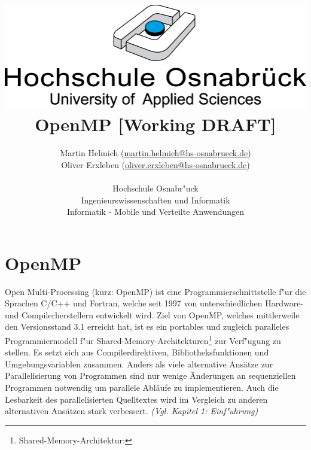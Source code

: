 \documentclass[11pt]{scrartcl}
\begin{document}
\author{%
	Martin Helmich \small(\href{mailto:martin.helmich@hs-osnabrueck.de}{martin.helmich@hs-osnabrueck.de})\\%
	Oliver Erxleben \small(\href{mailto:oliver.erxleben@hs-osnabrueck.de}{oliver.erxleben@hs-osnabrueck.de})\\ \\%
	Hochschule Osnabr"uck \\%
	Ingenieurswissenschaften und Informatik \\%
	Informatik - Mobile und Verteilte Anwendungen }

\title{\includegraphics[scale=0.75,keepaspectratio]{img/hs_os.png}\linebreak \linebreak
OpenMP [Working DRAFT]}

\maketitle
\thispagestyle{empty}
\tableofcontents

\pagebreak
\pagestyle{plain}
\setcounter{page}{1}
\section{OpenMP} Open Multi-Processing (kurz: OpenMP) ist eine Programmierschnittstelle
f"ur die Sprachen C/C++ und Fortran, welche seit 1997 von unterschiedlichen Hardware- und Compilerherstellern entwickelt wird. Ziel von OpenMP, welches mittlerweile den
Versionsstand 3.1 erreicht hat, ist es ein portables und zugleich paralleles
Programmiermodell f"ur Shared-Memory-Architekturen\footnote{Shared-Memory-Architektur: } zur Verf"ugung zu stellen. Es setzt sich aus Compilerdirektiven, Bibliotheksfunktionen und Umgebungsvariablen zusammen. Anders als viele alternative Ansätze zur Parallelisierung von Programmen sind nur wenige Änderungen an sequenziellen Programmen notwendig um parallele Abläufe zu implementieren. Auch die Lesbarkeit des parallelisierten Quelltextes wird im Vergleich zu anderen alternativen Ansätzen stark verbessert. \textit{(Vgl. \cite{omp08} Kapitel 1: Einf"uhrung)}
\end{document}
